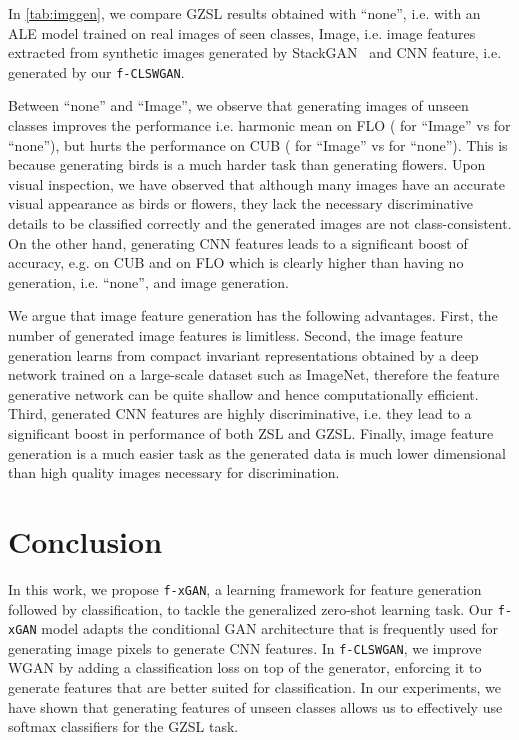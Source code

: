 \documentclass[10pt,twocolumn,letterpaper]{article}
\def\mthd{\texttt{f-xGAN}\xspace}
\begin{document}
In \autoref{tab:imggen}, we compare GZSL results obtained with ``none'', i.e. with an ALE model trained on real images of seen classes, Image, i.e. image features extracted from  synthetic images generated by StackGAN~\cite{han2017stackgan} and CNN feature, i.e. generated by our \texttt{f-CLSWGAN}. 

Between ``none'' and ``Image'', we observe that generating images of unseen classes improves the performance i.e. harmonic mean on FLO ( for ``Image'' vs  for ``none''), but hurts the performance on CUB ( for ``Image'' vs  for ``none''). This is because generating birds is a much harder task than generating flowers.
Upon visual inspection, we have observed that although many images have an accurate visual appearance as birds or flowers, they lack the necessary discriminative details to be classified correctly and the generated images are not class-consistent. On the other hand, generating CNN features leads to a significant boost of accuracy, e.g.  on CUB and  on FLO which is clearly higher than having no generation, i.e. ``none'', and image generation. 

We argue that image feature generation has the following advantages. First, the number of generated image features is limitless. Second, the image feature generation learns from compact invariant representations obtained by a deep network trained on a large-scale dataset such as ImageNet, therefore the feature generative network can be quite shallow and hence computationally efficient.
Third, generated CNN features are highly discriminative, i.e. they lead to a significant boost in performance of both ZSL and GZSL. Finally, image feature generation is a much easier task as the generated data is much lower dimensional than high quality images necessary for discrimination.







\section{Conclusion}

In this work, we propose \mthd, a learning framework for feature generation followed by classification, to tackle the generalized zero-shot learning task.
Our \mthd model adapts the conditional GAN architecture that is frequently used for generating image pixels to generate CNN features.
In \texttt{f-CLSWGAN}, we improve WGAN by adding a classification loss on top of the generator, enforcing it to generate features that are better suited for classification. 
In our experiments, we have shown that generating features of unseen classes allows us to effectively use softmax classifiers for the GZSL task.
\end{document}
